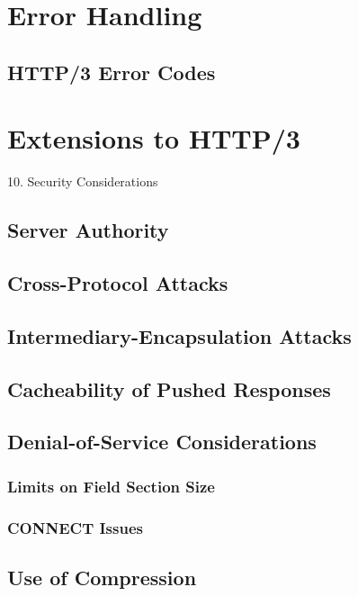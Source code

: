 \documentclass{article}
\begin{document}
\section{Error Handling}

\subsection{HTTP/3 Error Codes}

\section{Extensions to HTTP/3}

10. Security Considerations

\subsection{Server Authority}

\subsection{Cross-Protocol Attacks}

\subsection{Intermediary-Encapsulation Attacks}

\subsection{Cacheability of Pushed Responses}

\subsection{Denial-of-Service Considerations}

\subsubsection{Limits on Field Section Size}

\subsubsection{CONNECT Issues}

\subsection{Use of Compression}
\end{document}
